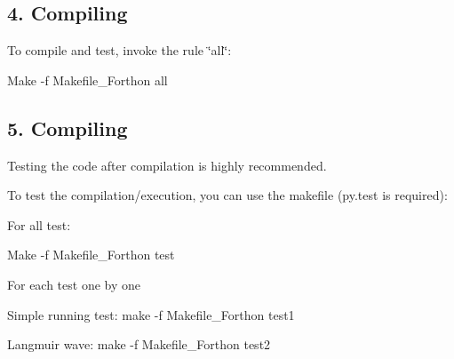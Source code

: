 \subsection*{4. Compiling }

To compile and test, invoke the rule \char`\"{}all\char`\"{}\+:


\begin{DoxyItemize}
\item Make -\/f Makefile\+\_\+\+Forthon all
\end{DoxyItemize}

\subsection*{5. Compiling }

Testing the code after compilation is highly recommended.

To test the compilation/execution, you can use the makefile (py.\+test is required)\+:

For all test\+:
\begin{DoxyItemize}
\item Make -\/f Makefile\+\_\+\+Forthon test
\end{DoxyItemize}

For each test one by one
\begin{DoxyItemize}
\item Simple running test\+: make -\/f Makefile\+\_\+\+Forthon test1
\item Langmuir wave\+: make -\/f Makefile\+\_\+\+Forthon test2 
\end{DoxyItemize}
